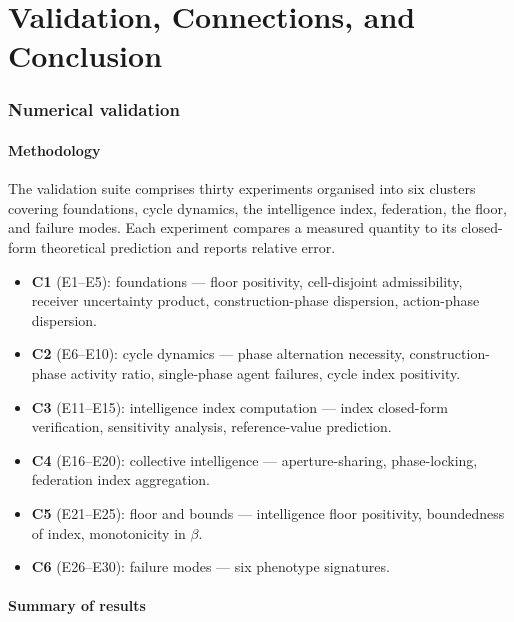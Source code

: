 \documentclass[11pt,twocolumn,a4paper]{article}
\begin{document}
\part{Validation, Connections, and Conclusion}

\section{Numerical validation}
\label{sec:validation}

\subsection{Methodology}

The validation suite comprises thirty experiments organised into six clusters covering
foundations, cycle dynamics, the intelligence index, federation, the floor, and failure
modes. Each experiment compares a measured quantity to its closed-form theoretical
prediction and reports relative error.

\begin{itemize}[leftmargin=*]
\item \textbf{C1} (E1--E5): foundations --- floor positivity, cell-disjoint admissibility,
receiver uncertainty product, construction-phase dispersion, action-phase dispersion.
\item \textbf{C2} (E6--E10): cycle dynamics --- phase alternation necessity,
construction-phase activity ratio, single-phase agent failures, cycle index positivity.
\item \textbf{C3} (E11--E15): intelligence index computation --- index closed-form
verification, sensitivity analysis, reference-value prediction.
\item \textbf{C4} (E16--E20): collective intelligence --- aperture-sharing,
phase-locking, federation index aggregation.
\item \textbf{C5} (E21--E25): floor and bounds --- intelligence floor positivity,
boundedness of index, monotonicity in $\beta$.
\item \textbf{C6} (E26--E30): failure modes --- six phenotype signatures.
\end{itemize}

\subsection{Summary of results}
\end{document}
